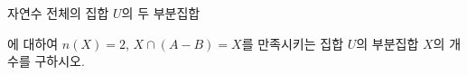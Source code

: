 자연수 전체의 집합 $U$의 두 부분집합\par\smallskip{}\par\smallskip\noindent 에 대하여 $n(X)=2$, $X\cap(A-B)=X$를 만족시키는 집합 $U$의 부분집합 $X$의 개수를 구하시오.
